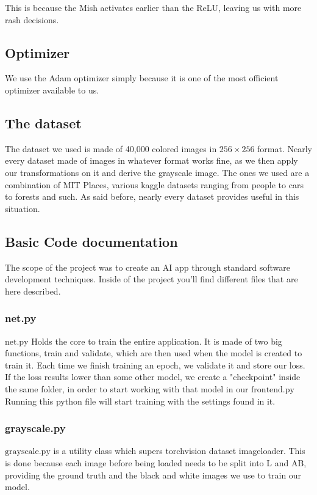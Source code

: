 \documentclass{article}
\begin{document}
This is because the Mish activates earlier than the ReLU, leaving us with more rash
decisions. 

\subsection{Optimizer}
We use the Adam optimizer simply because it is one of the most officient optimizer 
available to us.  

\subsection{The dataset}
The dataset we used is made of 40,000 colored images in $256 \times 256$ format.
Nearly every dataset made of images in whatever format works fine, as we then apply
our transformations on it and derive the grayscale image. 
The ones we used are a combination of MIT Places, various kaggle datasets ranging 
from people to cars to forests and such. As said before, nearly every dataset provides
useful in this situation. 


\subsection{Basic Code documentation}
The scope of the project was to create an AI app through standard 
software development techniques. Inside of the project you'll find
different files that are here described. 

\subsubsection{net.py}
$\text{net.py}$ Holds the core to train the entire application. It is made of two 
big functions, train and validate, which are then used when the model is created to 
train it. Each time we finish training an epoch, we validate it and store our loss. 
If the loss results lower than some other model, we create a "checkpoint" inside the 
same folder, in order to start working with that model in our $\text{frontend.py}$ 
Running this python file will start training with the settings found 
in it. 

\subsubsection{grayscale.py}
$\text{grayscale.py}$ is a utility class which supers torchvision dataset imageloader. 
This is done because each image before being loaded needs to be split into L and AB, 
providing the ground truth and the black and white images we use to train our model. 
\end{document}
